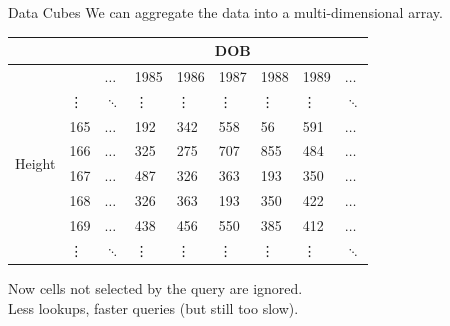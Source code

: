 \documentclass{beamer}
\theoremstyle{definition}
\theoremstyle{definition}
\begin{document}
\begin{frame}{Data Cubes}
    We can aggregate the data into a multi-dimensional array.\cite{Gray96}

    \begin{table}[h]\footnotesize
        \begin{tabular} { | l | l | l | l | l | l | l | l | l |}
        \hline
        & & \multicolumn{7}{|c|}{DOB} \\ \hline
        & & $\hdots$ & 1985 & 1986 & 1987 & 1988 & 1989 & $\hdots$ \\ \hline
        \multirow{6}{*}{Height}
        & \vdots & $\ddots$ & \vdots & \vdots & \vdots & \vdots & \vdots & $\ddots$ \\
        & 165 & $\hdots$ & 192 & 342 & 558 & 56 & 591 & $\hdots$ \\
        & 166 & $\hdots$ & 325 & 275 & 707 & 855 & 484 & $\hdots$ \\
        & 167 & $\hdots$ & 487 & 326 & 363 & 193 & 350 & $\hdots$ \\
        & 168 & $\hdots$ & 326 & 363 & 193 & 350 & 422 & $\hdots$ \\
        & 169 & $\hdots$ & 438 & 456 & 550 & 385 & 412 & $\hdots$ \\
        & \vdots & $\ddots$ & \vdots & \vdots & \vdots & \vdots & \vdots & $\ddots$ \\
        \hline
        \end{tabular}
    \end{table}

    Now cells not selected by the query are ignored. \\
    Less lookups, faster queries (but still too slow).
\end{frame}
\end{document}
